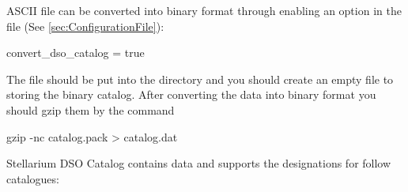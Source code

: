 ASCII file can be converted into binary format through enabling an option in the file  (See \ref{sec:ConfigurationFile}):
\begin{configfile}
[devel]
convert_dso_catalog = true
\end{configfile}

The file  should be put into the directory
 and you should create an empty 
file  to storing the binary catalog. After converting the data into binary format 
you should gzip them by the command 
\begin{commands}
gzip -nc catalog.pack > catalog.dat
\end{commands}

Stellarium DSO Catalog contains data and supports the designations for
follow catalogues:

